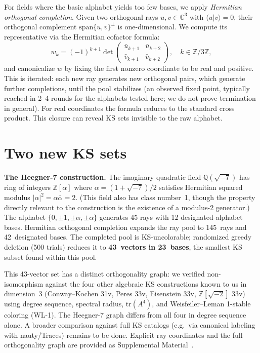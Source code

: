 \documentclass[twocolumn,prl,superscriptaddress,nofootinbib]{revtex4-2}
\newcommand{\C}{\mathbb{C}}
\newcommand{\Z}{\mathbb{Z}}
\newcommand{\Q}{\mathbb{Q}}
\begin{document}
For fields where the basic alphabet yields too few bases, we apply \emph{Hermitian orthogonal completion}. Given two orthogonal rays $u, v \in \C^3$ with $\langle u | v \rangle = 0$, their orthogonal complement $\mathrm{span}\{u,v\}^\perp$ is one-dimensional. We compute its representative via the Hermitian cofactor formula:
\[
w_k = (-1)^{k+1} \det \begin{pmatrix} \bar{u}_{k+1} & \bar{u}_{k+2} \\ \bar{v}_{k+1} & \bar{v}_{k+2} \end{pmatrix}, \quad k \in \Z/3\Z,
\]
and canonicalize $w$ by fixing the first nonzero coordinate to be real and positive. This is iterated: each new ray generates new orthogonal pairs, which generate further completions, until the pool stabilizes (an observed fixed point, typically reached in 2--4 rounds for the alphabets tested here; we do not prove termination in general). For real coordinates the formula reduces to the standard cross product. This closure can reveal KS sets invisible to the raw alphabet.

\section{Two new KS sets}

\textbf{The Heegner-7 construction.} The imaginary quadratic field $\Q(\sqrt{-7})$ has ring of integers $\Z[\alpha]$ where $\alpha = (1{+}\sqrt{-7})/2$ satisfies Hermitian squared modulus $|\alpha|^2 = \alpha\bar\alpha = 2$. (This field also has class number~1, though the property directly relevant to the construction is the existence of a modulus-2 generator.) The alphabet $\{0, \pm 1, \pm\alpha, \pm\bar\alpha\}$ generates 45 rays with 12 designated-alphabet bases. Hermitian orthogonal completion expands the ray pool to 145~rays and 42~designated bases. The completed pool is KS-uncolorable; randomized greedy deletion (500 trials) reduces it to \textbf{43~vectors in 23~bases}, the smallest KS subset found within this pool.

This 43-vector set has a distinct orthogonality graph: we verified non-isomorphism against the four other algebraic KS constructions known to us in dimension~3 (Conway--Kochen 31v, Peres 33v, Eisenstein 33v, $\Z[\sqrt{-2}]$ 33v) using degree sequence, spectral radius, $\mathrm{tr}(A^4)$, and Weisfeiler--Leman 1-stable coloring (WL-1). The Heegner-7 graph differs from all four in degree sequence alone. A broader comparison against full KS catalogs (e.g.\ via canonical labeling with nauty/Traces) remains to be done. Explicit ray coordinates and the full orthogonality graph are provided as Supplemental Material~\cite{SupplementalMaterial}.
\end{document}
